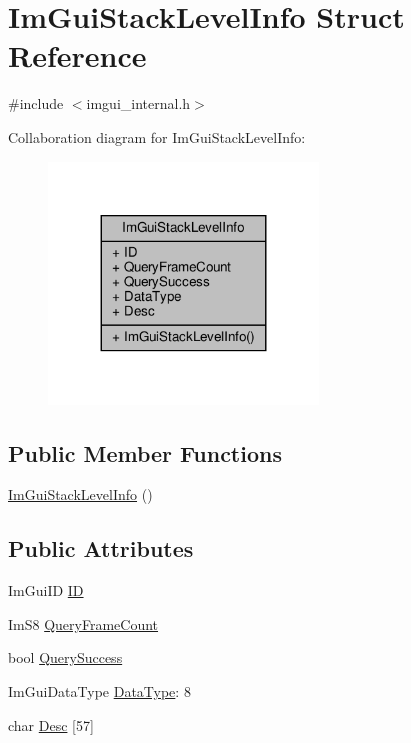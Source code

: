 \hypertarget{structImGuiStackLevelInfo}{}\section{Im\+Gui\+Stack\+Level\+Info Struct Reference}
\label{structImGuiStackLevelInfo}


{\ttfamily \#include $<$imgui\+\_\+internal.\+h$>$}



Collaboration diagram for Im\+Gui\+Stack\+Level\+Info\+:
\nopagebreak
\begin{figure}[H]
\begin{center}
\leavevmode
\includegraphics[width=203pt]{structImGuiStackLevelInfo__coll__graph}
\end{center}
\end{figure}
\subsection*{Public Member Functions}
\begin{DoxyCompactItemize}
\item 
\hyperlink{structImGuiStackLevelInfo_a8d159c0fe04c79e2db144ba668a2f7a7}{Im\+Gui\+Stack\+Level\+Info} ()
\end{DoxyCompactItemize}
\subsection*{Public Attributes}
\begin{DoxyCompactItemize}
\item 
Im\+Gui\+ID \hyperlink{structImGuiStackLevelInfo_af13bae3a6f0089fdfe30ef93a47f3617}{ID}
\item 
Im\+S8 \hyperlink{structImGuiStackLevelInfo_a54555db636b1247dd9e0ebcdd781f46f}{Query\+Frame\+Count}
\item 
bool \hyperlink{structImGuiStackLevelInfo_af73a14a915d748f1ebe5c4a4aedd5325}{Query\+Success}
\item 
Im\+Gui\+Data\+Type \hyperlink{structImGuiStackLevelInfo_a07500f6232f21e437a931a1b69805771}{Data\+Type}\+: 8
\item 
char \hyperlink{structImGuiStackLevelInfo_a9111eb5bbd8bdd989210da0453c5f9ff}{Desc} \mbox{[}57\mbox{]}
\end{DoxyCompactItemize}


